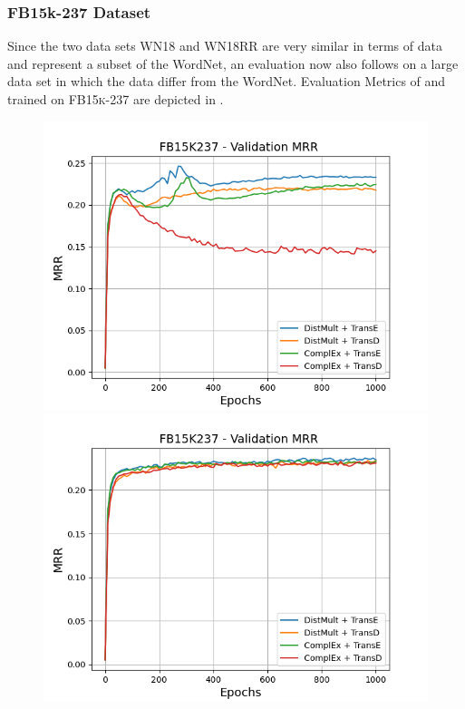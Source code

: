 \subsubsection{FB15k-237 Dataset}
\label{subsubsec:methods_fb15k237}
%
Since the two data sets WN18 and WN18RR are very similar in terms of data and represent a subset of the WordNet, an evaluation now also follows on a large data set in which the data differ from the WordNet.
Evaluation Metrics of \usmax and \ussoftmax trained on \textsc{FB15k-237} are depicted in .
\begin{figure}
    \centering
    \begin{minipage}{.5\textwidth}
      \centering
      \includegraphics[width=0.9\linewidth]{figures/results/gan_train/not_pretrained/uncertainty/max/entropy/fb15k237/1k_epochs/uncertainty_fb15k237_mrrs.png}
    \end{minipage}%
    \begin{minipage}{.5\textwidth}
      \centering
      \includegraphics[width=0.9\linewidth]{figures/results/gan_train/not_pretrained/uncertainty/max_distribution/entropy/fb15k237/1k_epochs/uncertainty_fb15k237_mrrs.png}

\end{minipage}
\end{figure}
